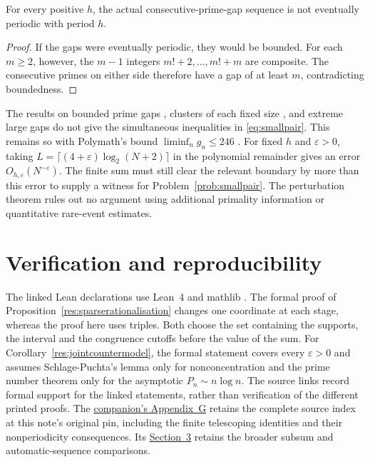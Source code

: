 \documentclass[11pt]{article}
\begin{document}
\begin{proposition}\label{res:gap-nonperiodic}
For every positive $h$, the actual consecutive-prime-gap sequence is not
eventually periodic with period $h$.
\end{proposition}
\begin{proof}
If the gaps were eventually periodic, they would be bounded.  For each
$m\ge2$, however, the $m-1$ integers $m!+2,\ldots,m!+m$ are composite.
The consecutive primes on either side therefore have a gap of at least
$m$, contradicting boundedness.
\end{proof}

The results on bounded prime gaps \cite{zhang2014}, clusters of each
fixed size \cite{maynard2015,polymath2014}, and extreme large gaps
\cite{fgkmt2018} do not give the simultaneous inequalities in \eqref{eq:smallpair}.
This remains so with Polymath's bound $\liminf_n g_n\le246$
\cite[Theorem~1.4(i)]{polymath2014}.  For fixed $h$ and $\varepsilon>0$,
taking $L=\lceil(4+\varepsilon)\log_2(N+2)\rceil$ in the polynomial
remainder gives an error $O_{h,\varepsilon}(N^{-\varepsilon})$.
The finite sum must still clear the relevant boundary by more than this
error to supply a witness for Problem~\ref{prob:smallpair}.  The perturbation
theorem rules out no argument using additional primality information or
quantitative rare-event estimates.

\section{Verification and reproducibility}\label{sec:pinned-lean-sources}
\evidenceparagraph{\evidencerecordurl}
The linked Lean declarations use Lean~4 \cite{lean4} and mathlib
\cite{mathlib}.  The formal proof of
Proposition~\ref{res:sparserationalisation} changes one coordinate at each
stage, whereas the proof here uses triples.  Both choose the set containing the supports,
the interval and the congruence cutoffs before the value of the sum.
For Corollary~\ref{res:jointcountermodel}, the formal statement covers
every $\varepsilon>0$ and assumes Schlage-Puchta's lemma only for
nonconcentration and the prime number theorem only for the asymptotic
$P_n\sim n\log n$.  The source links record formal support for the linked
statements, rather than verification of the different printed proofs.
The \href{erdos251-prime-gap-reasoning-surface.pdf\#short-source-index}{companion's Appendix~G}
retains the complete source index at this note's original pin, including
the finite telescoping identities and their nonperiodicity consequences.
Its \href{erdos251-prime-gap-reasoning-surface.pdf\#context}{Section~3}
retains the broader subsum and automatic-sequence comparisons.
\end{document}
